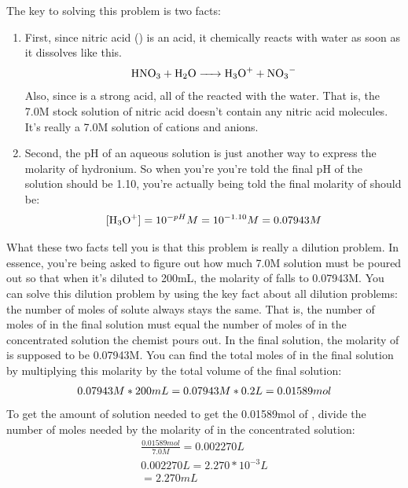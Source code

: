 \documentclass{article}  %
\begin{document}
The key to solving this problem is two facts:
\begin{enumerate}
    \item First, since nitric acid () is an acid, it chemically reacts with water as soon as it dissolves like this.
    \begin{equation*}
        \begin{aligned}
            \ce{HNO3 + H2O -> H3O+ + NO3-}
        \end{aligned}
    \end{equation*}
    Also, since  is a strong acid, all of the  reacted with the water. That is, the 7.0M stock solution of nitric acid doesn't contain any nitric acid molecules. It's really a 7.0M solution of  cations and  anions.
    \item Second, the pH of an aqueous solution is just another way to express \ce{[H3O+]} the molarity of hydronium. So when you're you're told the final pH of the solution should be 1.10, you're actually being told the final molarity of  should be:
    \begin{equation*}
        \begin{aligned}
            \ce{[H3O+]} = 10^{-pH}M = 10^{-1.10}M = 0.07943M
        \end{aligned}
    \end{equation*}
\end{enumerate}
What these two facts tell you is that this problem is really a dilution problem. In essence, you're being asked to figure out how much 7.0M  solution must be poured out so that when it's diluted to 200mL, the molarity of  falls to 0.07943M. 
\newline
\newline
You can solve this dilution problem by using the key fact about all dilution problems: the number of moles of solute always stays the same. That is, the number of moles of  in the final solution must equal the number of moles of  in the concentrated solution the chemist pours out. 
\newline
\newline
In the final solution, the molarity of  is supposed to be 0.07943M. You can find the total moles of  in the final solution by multiplying this molarity by the total volume of the final solution:
\begin{equation*}
    \begin{aligned}
        0.079\newline43M * 200mL = 0.07943M * 0.2L = 0.01589mol
    \end{aligned}
\end{equation*}
To get the amount of solution needed to get the 0.01589mol of , divide the number of moles needed by the molarity of  in the concentrated solution:
\begin{equation*}
    \begin{aligned}
        \frac{0.01589mol}{7.0M} = 0.002270L \\
        0.002270L = 2.270*10^{-3}L \\
        = 2.270mL
    \end{aligned}
\end{equation*}
\end{document}

